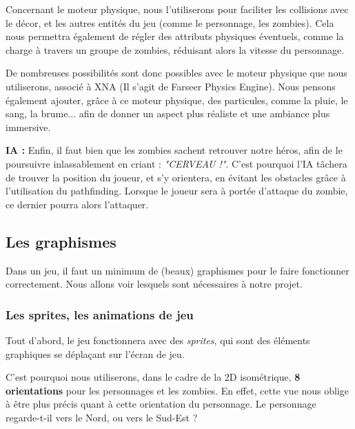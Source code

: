 \documentclass{article}
\begin{document}
\par
Concernant le moteur physique, nous l'utiliserons pour faciliter les collisions avec le décor, et les autres entités du jeu (comme le personnage, les zombies). Cela nous permettra également de régler des attributs physiques éventuels, comme la charge à travers un groupe de zombies, réduisant alors la vitesse du personnage.
\newline

\par
De nombreuses possibilités sont donc possibles avec le moteur physique que nous utiliserons, associé à XNA (Il s'agit de Farseer Physics Engine). Nous pensons également ajouter, grâce à ce moteur physique, des particules, comme la pluie, le sang, la brume... afin de donner un aspect plus réaliste et une ambiance plus immersive.
\newline

\par
\textbf{IA :} Enfin, il faut bien que les zombies sachent retrouver notre héros, afin de le poursuivre inlassablement en criant : \textit{"CERVEAU !"}. C'est pourquoi l'IA tâchera de trouver la position du joueur, et s'y orientera, en évitant les obstacles grâce à l'utilisation du pathfinding. Lorsque le joueur sera à portée d'attaque du zombie, ce dernier pourra alors l'attaquer.
\newline



\newpage
\subsection{Les graphismes}

\par
Dans un jeu, il faut un minimum de (beaux) graphismes pour le faire fonctionner correctement. Nous allons voir lesquels sont nécessaires à notre projet.
\newline

\subsubsection{Les sprites, les animations de jeu}

\par
Tout d'abord, le jeu fonctionnera avec des \textit{sprites}, qui sont des éléments graphiques se déplaçant sur l'écran de jeu.
\newline

\par
C'est pourquoi nous utiliserons, dans le cadre de la 2D isométrique, \textbf{8 orientations} pour les personnages et les zombies. En effet, cette vue nous oblige à être plus précis quant à cette orientation du personnage. Le personnage regarde-t-il vers le Nord, ou vers le Sud-Est ?
\newline
\end{document}
